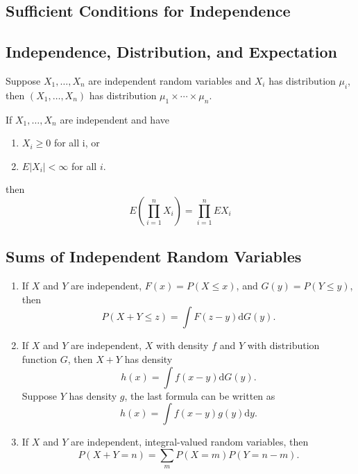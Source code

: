 \subsection{Sufficient Conditions for Independence}

\subsection{Independence, Distribution, and Expectation}

\begin{theorem}
    Suppose $X_{1},\ldots,X_{n}$ are independent random variables and $X_{i}$ has distribution $\mu_{i}$, then $\left(X_{1},\ldots,X_{n}\right)$ has distribution $\mu_{1}\times\cdots\times\mu_{n}$.
\end{theorem}

\begin{theorem}
    If $X_{1},\ldots,X_{n}$ are independent and have
    \begin{enumerate}
        \item $X_{i} \geq 0$ for all i, or
        \item $E\left|X_{i}\right|<\infty$ for all $i$.
    \end{enumerate}
    then
    \begin{equation}
        E\left(\prod_{i=1}^{n}X_{i}\right)=\prod_{i=1}^{n}EX_{i}
    \end{equation}
\end{theorem}

\subsection{Sums of Independent Random Variables}

\begin{theorem}
    \begin{enumerate}
        \item If $X$ and $Y$ are independent, $F(x)=P(X\leq x)$, and $G(y)=P(Y\leq y)$, then
              \begin{equation}
                  P(X+Y\leq z)=\int F(z-y)\mathrm{d}G(y).
              \end{equation}
        \item If $X$ and $Y$ are independent,  $X$ with density $f$ and $Y$ with distribution function $G$, then $X+Y$ has density
              \begin{equation}
                  h(x)=\int f(x-y)\mathrm{d}G(y).
              \end{equation}
              Suppose $Y$ has density $g$, the last formula can be written as
              \begin{equation}
                  h(x)=\int f(x-y)g(y)\mathrm{d}y.
              \end{equation}
        \item If $X$ and $Y$ are independent, integral-valued random variables, then
              \begin{equation}
                  P(X+Y=n)=\sum_{m}P(X=m)P(Y=n-m).
              \end{equation}
    \end{enumerate}
\end{theorem}

